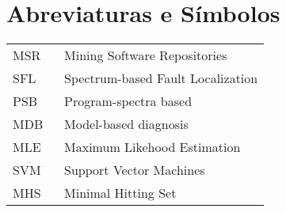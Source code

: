 \chapter*{Abreviaturas e Símbolos}

\begin{flushleft}
\begin{tabular}{l p{0.8\linewidth}}
MSR 	& Mining Software Repositories\\
SFL 	& Spectrum-based Fault Localization \\
PSB		& Program-spectra based\\
MDB		& Model-based diagnosis\\
MLE 	& Maximum Likehood Estimation\\
SVM 	& Support Vector Machines\\
MHS		& Minimal Hitting Set\\
\end{tabular}
\end{flushleft}

